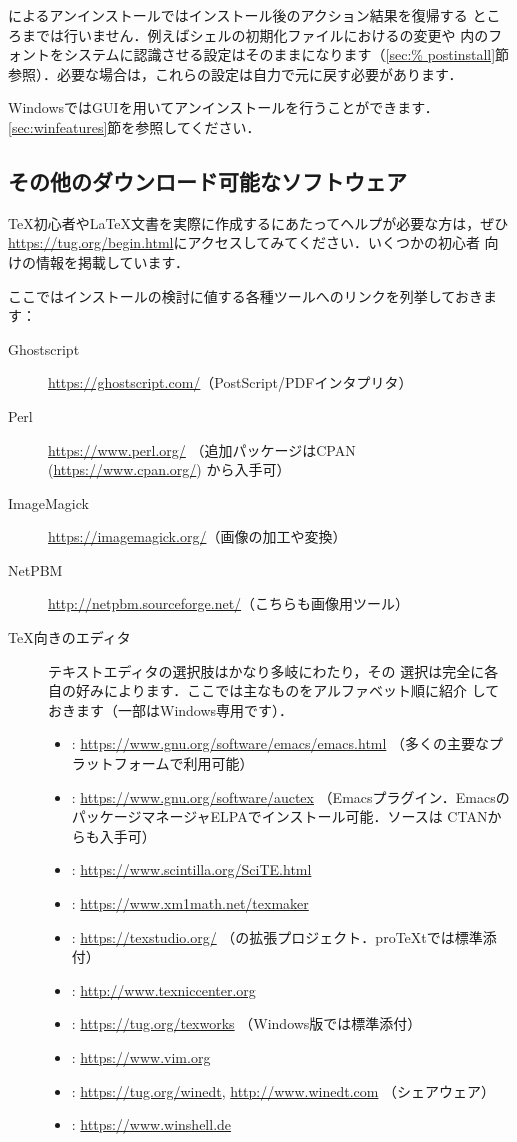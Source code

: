 \documentclass[uplatex,dvipdfmx,tombow]{jsarticle}
\begin{document}
によるアンインストールではインストール後のアクション結果を復帰する
ところまでは行いません．例えばシェルの初期化ファイルにおけるの変更や
\TL 内のフォントをシステムに認識させる設定はそのままになります（\ref{sec:%
postinstall}節参照）．必要な場合は，これらの設定は自力で元に戻す必要があります．

WindowsではGUIを用いてアンインストールを行うことができます．
\ref{sec:winfeatures}節を参照してください．

\subsection{その他のダウンロード可能なソフトウェア}

\TeX 初心者や\LaTeX 文書を実際に作成するにあたってヘルプが必要な方は，ぜひ
\url{https://tug.org/begin.html}にアクセスしてみてください．いくつかの初心者
向けの情報を掲載しています．

ここではインストールの検討に値する各種ツールへのリンクを列挙しておきます：
%
\begin{description}
\item[Ghostscript] \url{https://ghostscript.com/}（PostScript/PDFインタプリタ）
\item[Perl] \url{https://www.perl.org/}%
  （追加パッケージはCPAN (\url{https://www.cpan.org/}) から入手可）
\item[ImageMagick] \url{https://imagemagick.org/}（画像の加工や変換）
\item[NetPBM] \url{http://netpbm.sourceforge.net/}（こちらも画像用ツール）
\item[\TeX 向きのエディタ] テキストエディタの選択肢はかなり多岐にわたり，その
  選択は完全に各自の好みによります．ここでは主なものをアルファベット順に紹介
  しておきます（一部はWindows専用です）．
  \begin{itemize}
  \item {}: \url{https://www.gnu.org/software/emacs/emacs.html}%
    （多くの主要なプラットフォームで利用可能）
  \item {}: \url{https://www.gnu.org/software/auctex}%
    （Emacsプラグイン．EmacsのパッケージマネージャELPAでインストール可能．ソースは
    CTANからも入手可）
  \item {}: \url{https://www.scintilla.org/SciTE.html}
  \item {}: \url{https://www.xm1math.net/texmaker}
  \item {}: \url{https://texstudio.org/}%
    （の拡張プロジェクト．pro\TeX{}tでは標準添付）
  \item {}: \url{http://www.texniccenter.org}
  \item {}: \url{https://tug.org/texworks}%
    （Windows版\TL では標準添付）
  \item {}: \url{https://www.vim.org}
  \item {}: \url{https://tug.org/winedt}, \url{http://www.winedt.com}%
    （シェアウェア）
  \item {}: \url{https://www.winshell.de}
  \end{itemize}
\end{description}
\end{document}
